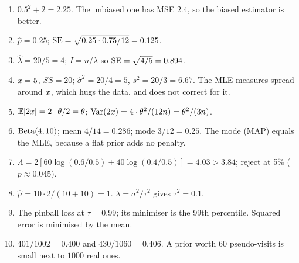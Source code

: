 \begin{enumerate}
  \item $0.5^2 + 2 = 2.25$. The unbiased one has MSE $2.4$, so the biased estimator is
  better.
  \item $\hat p = 0.25$; $\operatorname{SE} = \sqrt{0.25\cdot0.75/12} = 0.125$.
  \item $\hat\lambda = 20/5 = 4$; $I = n/\lambda$ so $\operatorname{SE} = \sqrt{4/5} = 0.894$.
  \item $\bar{x} = 5$, $SS = 20$; $\hat\sigma^2 = 20/4 = 5$, $s^2 = 20/3 = 6.67$. The MLE
  measures spread around $\bar{x}$, which hugs the data, and does not correct for it.
  \item $\operatorname{\mathbb{E}}[2\bar{x}] = 2\cdot\theta/2 = \theta$;
  $\operatorname{Var}(2\bar{x}) = 4\cdot\theta^2/(12n) = \theta^2/(3n)$.
  \item $\operatorname{Beta}(4,10)$; mean $4/14 = 0.286$; mode $3/12 = 0.25$. The mode (MAP) equals the
  MLE, because a flat prior adds no penalty.
  \item $\Lambda = 2[60\log(0.6/0.5) + 40\log(0.4/0.5)] = 4.03 > 3.84$; reject at 5\%
  ($p\approx0.045$).
  \item $\hat\mu = 10\cdot2/(10+10) = 1$. $\lambda = \sigma^2/\tau^2$ gives $\tau^2 = 0.1$.
  \item The pinball loss at $\tau=0.99$; its minimiser is the 99th percentile. Squared
  error is minimised by the mean.
  \item $401/1002 = 0.400$ and $430/1060 = 0.406$. A prior worth $60$ pseudo-visits is
  small next to $1000$ real ones.
\end{enumerate}
